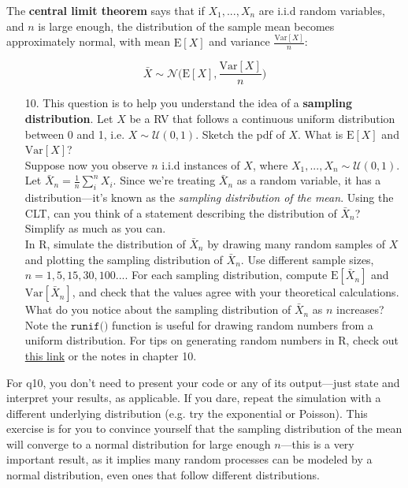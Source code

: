 \documentclass[10pt]{extarticle}
\newcommand{\E}{\text{E}}
\newcommand{\Var}{\text{Var}}
\begin{document}
\hfill 

The {\bf central limit theorem} says that if $X_1, ..., X_n$ are i.i.d random variables, and $n$ is large enough, the distribution of the sample mean becomes approximately normal, with mean $\E[X]$ and variance $\frac{\Var[X]}{n}$:

$$\bar X \sim \mathcal N \bigg( \E[X], \frac{\Var[X]}{n} \bigg)$$ 

\hfill 

\begin{itemize}

	\item[10.] This question is to help you understand the idea of a {\bf sampling distribution}. Let $X$ be a RV that follows a continuous uniform distribution between 0 and 1, i.e. $X \sim \mathcal U(0,1)$. Sketch the pdf of $X$. What is $\E[X]$ and $\Var[X]$? \\ 

Suppose now you observe $n$ i.i.d instances of $X$, where $X_1, ..., X_n \sim \mathcal U(0,1)$. Let $\bar X_n = \frac 1n \sum_i^n X_i$. Since we're treating $\bar X_n$ as a random variable, it has a distribution---it's known as the {\it sampling distribution of the mean}. Using the CLT, can you think of a statement describing the distribution of $\bar X_n$? Simplify as much as you can. \\ 

In R, simulate the distribution of $\bar X_n$ by drawing many random samples of $X$ and plotting the sampling distribution of $\bar X_n$. Use different sample sizes, $n = 1, 5, 15, 30, 100...$. For each sampling distribution, compute $\E[\bar X_n]$ and $\Var[\bar X_n]$, and check that the values agree with your theoretical calculations. What do you notice about the sampling distribution of $\bar X_n$ as $n$ increases? Note the $\texttt{runif()}$ function is useful for drawing random numbers from a uniform distribution. For tips on generating random numbers in R, check out \href{https://bookdown.org/ndphillips/YaRrr/generating-random-data.html}{this link} or the notes in chapter 10.  

\end{itemize}

\hfill 

For q10, you don't need to present your code or any of its output---just state and interpret your results, as applicable. If you dare, repeat the simulation with a different underlying distribution (e.g. try the exponential or Poisson). This exercise is for you to convince yourself that the sampling distribution of the mean will converge to a normal distribution for large enough $n$---this is a very important result, as it implies many random processes can be modeled by a normal distribution, even ones that follow different distributions.  
\end{document}
